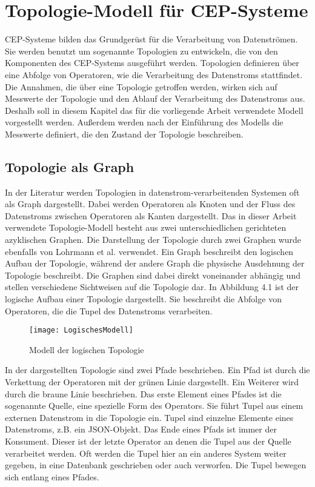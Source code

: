 \chapter{Topologie-Modell für CEP-Systeme}

CEP-Systeme bilden das Grundgerüst für die Verarbeitung von Datenströmen.
Sie werden benutzt um sogenannte Topologien zu entwickeln, die von den Komponenten des CEP-Systems ausgeführt werden.
Topologien definieren über eine Abfolge von Operatoren, wie die Verarbeitung des Datenstroms stattfindet.
Die Annahmen, die über eine Topologie getroffen werden, wirken sich auf Messwerte der Topologie und den Ablauf der Verarbeitung des Datenstroms aus.
Deshalb soll in diesem Kapitel das für die vorliegende Arbeit verwendete Modell vorgestellt werden.
Außerdem werden nach der Einführung des Modells die Messwerte definiert, die den Zustand der Topologie beschreiben.

\section{Topologie als Graph}

In der Literatur werden Topologien in datenstrom-verarbeitenden Systemen oft als Graph dargestellt.
Dabei werden Operatoren als Knoten und der Fluss des Datenstroms zwischen Operatoren als Kanten dargestellt.
Das in dieser Arbeit verwendete Topologie-Modell besteht aus zwei unterschiedlichen gerichteten azyklischen Graphen.
Die Darstellung der Topologie durch zwei Graphen wurde ebenfalls von Lohrmann et al. \cite{lohrmann_elastic_2015} verwendet.
Ein Graph beschreibt den logischen Aufbau der Topologie, während der andere Graph die physische Ausdehnung der Topologie beschreibt.
Die Graphen sind dabei direkt voneinander abhängig und stellen verschiedene Sichtweisen auf die Topologie dar.
In Abbildung 4.1 ist der logische Aufbau einer Topologie dargestellt. 
Sie beschreibt die Abfolge von Operatoren, die die Tupel des Datenstroms verarbeiten.

\begin{figure}
\texttt{[image: LogischesModell]}
\caption{Modell der logischen Topologie}
\end{figure}

In der dargestellten Topologie sind zwei Pfade beschrieben.
Ein Pfad ist durch die Verkettung der Operatoren mit der grünen Linie dargestellt.
Ein Weiterer wird durch die braune Linie beschrieben.
Das erste Element eines Pfades ist die sogenannte Quelle, eine spezielle Form des Operators.
Sie führt Tupel aus einem externen Datenstrom in die Topologie ein.
Tupel sind einzelne Elemente eines Datenstroms, z.B. ein JSON-Objekt.
Das Ende eines Pfads ist immer der Konsument.
Dieser ist der letzte Operator an denen die Tupel aus der Quelle verarbeitet werden. 
Oft werden die Tupel hier an ein anderes System weiter gegeben, in eine Datenbank geschrieben oder auch verworfen.
Die Tupel bewegen sich entlang eines Pfades.

